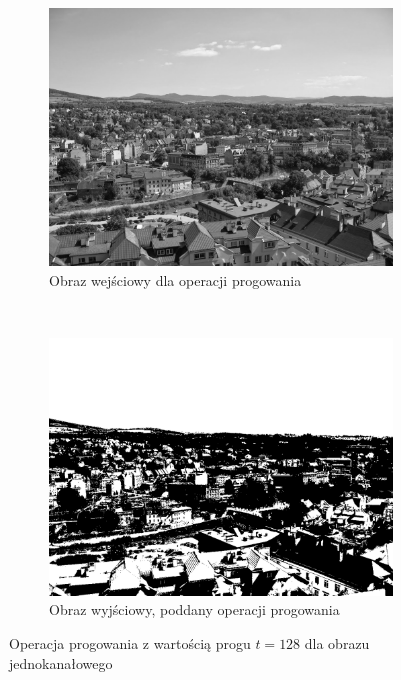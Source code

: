 \begin{figure}
  \centering
  \begin{subfigure}[b]{0.45\textwidth}
    \includegraphics[width=\textwidth]{img/threshold-before}
    \caption{Obraz wejściowy dla operacji progowania}
    \label{fig:threshold_before}
  \end{subfigure}
  ~
  \begin{subfigure}[b]{0.45\textwidth}
    \includegraphics[width=\textwidth]{img/threshold-after}
    \caption{Obraz wyjściowy, poddany operacji progowania}
    \label{fig:threshold_after}
  \end{subfigure}
  \caption{Operacja progowania z wartością progu $t=128$ dla obrazu jednokanałowego}\label{fig:threshold_image}
\end{figure}


